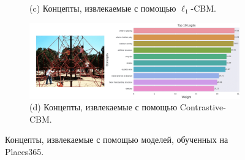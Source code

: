 \begin{figure}[h]
\begin{subfigure}
    \\
    (c) Концепты, извлекаемые с помощью $\ell_1$-CBM.
    \end{subfigure}
        \begin{subfigure}%
     \centering
  \includegraphics[width=0.75\linewidth]{./figures/contr_im_3-compressed.png}
    \\
    (d) Концепты, извлекаемые с помощью Contrastive-CBM.
    \end{subfigure}
    \caption{Концепты, извлекаемые с помощью моделей, обученных на Places365.}
    \label{fig:concepts_3}
\end{figure}

